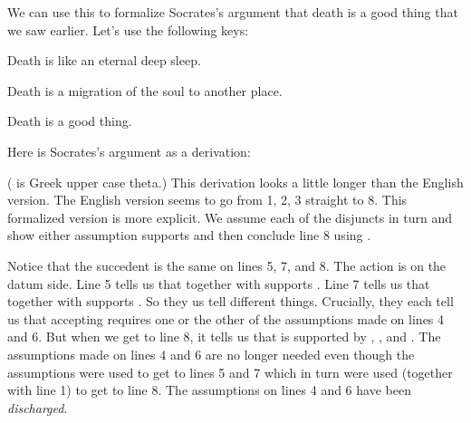 We can use this to formalize Socrates's argument that death is a good thing that 
we saw earlier.  Let's use the following keys:
\begin{lkey*}

\item[\p{S}] Death is like an eternal deep sleep.

\item[\p{M}] Death is a migration of the soul to another place. 

\item[\p{G}] Death is a good thing.

\end{lkey*}

Here is Socrates's argument as a derivation:


\begin{argumentN}[1]









\end{argumentN}


(\p{\Theta} is Greek upper case theta.) This derivation looks a little longer 
than the English version.  The English version
seems to go from 1, 2, 3 straight to 8. This formalized version is more 
explicit.  We assume each of the disjuncts in turn and show either assumption 
supports  and then conclude line 8 using \disjE.

Notice that the succedent is the same on lines 5, 7, and 8.  The action is on 
the datum side. Line 5 tells us that   together with \p{\Delta} supports 
.  Line 7 tells us that   together with \p{\Theta} supports .
 So they us tell different things.  Crucially, they each tell us that accepting 
  requires one or the other of the assumptions made on lines 4 and 6. But 
 when we get to line 8, it tells us that  is supported by \p{\Gamma}, 
 \p{\Delta}, and \p{\Theta}. The assumptions made on lines 4 and 6 are no longer 
 needed even though the assumptions were used to get to lines 5 and 7 which in 
 turn were used (together with line 1) to get to line 8.  The assumptions on 
 lines 4 and 6 have been \emph{discharged}.

